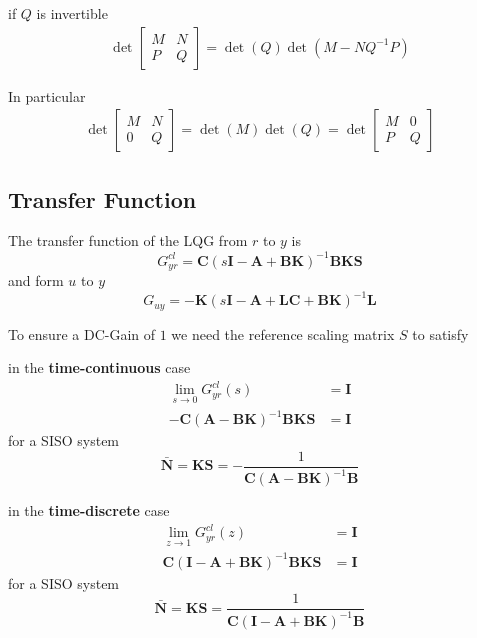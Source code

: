 if $Q$ is invertible
\begin{align*}
    \det\begin{bmatrix}
            M & N \\
            P & Q
        \end{bmatrix}
    = \det(Q)\det(M-NQ^{-1}P)
\end{align*}

In particular
\begin{align*}
    \det\begin{bmatrix}
            M & N \\
            0 & Q
        \end{bmatrix}
    = \det(M)\det(Q) =
    \det\begin{bmatrix}
            M & 0 \\
            P & Q
        \end{bmatrix}
\end{align*}

\subsection{Transfer Function}
The transfer function of the LQG from $r$ to $y$ is
\begin{equation*}
    G_{yr}^{cl} = \mathbf{C}{(s\mathbf{I}-\mathbf{A}+\mathbf{BK})}^{-1}\mathbf{BKS}
\end{equation*}
and form $u$ to $y$
\begin{equation*}
    G_{uy} = -\mathbf{K}{(s\mathbf{I}-\mathbf{A}+\mathbf{LC}+\mathbf{BK})}^{-1}\mathbf{L}
\end{equation*}


To ensure a DC-Gain of $1$ we need the reference scaling matrix $S$ to satisfy

in the \textbf{time-continuous} case
\begin{align*}
    \lim_{s\to0}G_{yr}^{cl}(s)                             & = \mathbf{I} \\
    -\mathbf{C}{(\mathbf{A}-\mathbf{BK})}^{-1}\mathbf{BKS} & = \mathbf{I}
\end{align*}
for a SISO system
\begin{equation*}
    \bar{\mathbf{N}}=\mathbf{KS}=-\frac{1}{\mathbf{C}{(\mathbf{A}-\mathbf{BK})}^{-1}\mathbf{B}}
\end{equation*}

in the \textbf{time-discrete} case
\begin{align*}
    \lim_{z\to1}G_{yr}^{cl}(z)                                       & = \mathbf{I} \\
    \mathbf{C}{(\mathbf{I}-\mathbf{A}+\mathbf{BK})}^{-1}\mathbf{BKS} & = \mathbf{I}
\end{align*}
for a SISO system
\begin{equation*}
    \bar{\mathbf{N}}=\mathbf{KS}=\frac{1}{\mathbf{C}{(\mathbf{I}-\mathbf{A}+\mathbf{BK})}^{-1}\mathbf{B}}
\end{equation*}

